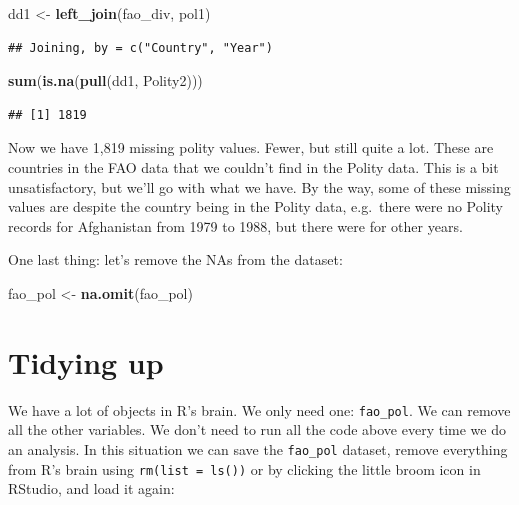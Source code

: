 \documentclass[]{book}
\newenvironment{Shaded}{\begin{snugshade}}{\end{snugshade}}
\newcommand{\KeywordTok}[1]{\textcolor[rgb]{0.13,0.29,0.53}{\textbf{#1}}}
\newcommand{\NormalTok}[1]{#1}
\newcommand{\StringTok}[1]{\textcolor[rgb]{0.31,0.60,0.02}{#1}}
\begin{document}
\begin{Shaded}
\begin{Highlighting}[]
\NormalTok{dd1 <-}\StringTok{ }\KeywordTok{left_join}\NormalTok{(fao_div, pol1)}
\end{Highlighting}
\end{Shaded}

\begin{verbatim}
## Joining, by = c("Country", "Year")
\end{verbatim}

\begin{Shaded}
\begin{Highlighting}[]
\KeywordTok{sum}\NormalTok{(}\KeywordTok{is.na}\NormalTok{(}\KeywordTok{pull}\NormalTok{(dd1, Polity2)))}
\end{Highlighting}
\end{Shaded}

\begin{verbatim}
## [1] 1819
\end{verbatim}

Now we have 1,819 missing polity values. Fewer, but still quite a lot. These are countries in the FAO data that we couldn't find in the Polity data. This is a bit unsatisfactory, but we'll go with what we have. By the way, some of these missing values are despite the country being in the Polity data, e.g.~there were no Polity records for Afghanistan from 1979 to 1988, but there were for other years.

One last thing: let's remove the NAs from the dataset:

\begin{Shaded}
\begin{Highlighting}[]
\NormalTok{fao_pol <-}\StringTok{ }\KeywordTok{na.omit}\NormalTok{(fao_pol)}
\end{Highlighting}
\end{Shaded}

\hypertarget{tidying-up}{%
\section{Tidying up}\label{tidying-up}}

We have a lot of objects in R's brain. We only need one: \texttt{fao\_pol}. We can remove all the other variables. We don't need to run all the code above every time we do an analysis. In this situation we can save the \texttt{fao\_pol} dataset, remove everything from R's brain using \texttt{rm(list\ =\ ls())} or by clicking the little broom icon in RStudio, and load it again:
\end{document}
